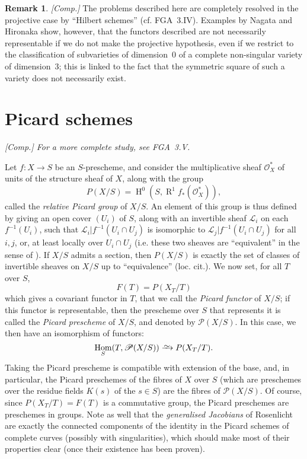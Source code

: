 \documentclass{article}
\theoremstyle{plain}
\theoremstyle{definition}
\newtheorem*{remark*}{Remark}
\newcommand{\sh}[1]{{\mathscr{#1}}}
\newcommand{\simto}{\xrightarrow{\raisebox{-0.7ex}[0ex][0ex]{$\sim$}}}
\DeclareMathOperator{\Hom}{Hom}
\DeclareMathOperator{\HH}{H}
\DeclareMathOperator{\RR}{R}
\newcommand{\oldpage}[1]{\marginpar{\footnotesize$\Big\vert$ \textit{p.~#1}}}
\begin{document}
\begin{remark*}
  \emph{[Comp.]}
  The problems described here are completely resolved in the projective case by ``Hilbert schemes'' (cf. FGA~3.IV).
  Examples by Nagata and Hironaka show, however, that the functors described are not necessarily representable if we do not make the projective hypothesis, even if we restrict to the classification of subvarieties of dimension~$0$ of a complete non-singular variety of dimension~$3$;
  this is linked to the fact that the symmetric square of such a variety does not necessarily exist.
\end{remark*}


\section{Picard schemes}
\label{C.3}

\emph{[Comp.] For a more complete study, see FGA~3.V.}

Let $f\colon X\to S$ be an $S$-prescheme, and consider the multiplicative sheaf $\sh{O}_X^*$ of units of the structure sheaf of $X$, along with the group
\[
  P(X/S) = \HH^0(S,\RR^1f_*(\sh{O}_X^*)),
\]
called the \emph{relative Picard group} of $X/S$.
An element of this group is thus defined by giving an open cover $(U_i)$ of $S$, along with an invertible sheaf $\sh{L}_i$ on each $f^{-1}(U_i)$, such that $\sh{L}_i|f^{-1}(U_i\cap U_j)$ is isomorphic to $\sh{L}_j|f^{-1}(U_i\cap U_j)$ for all $i,j$, or, at least locally over $U_i\cap U_j$ (i.e. these two sheaves are ``equivalent'' in the sense of \cite[B.4]{3}).
If $X/S$ admits a section, then $P(X/S)$ is exactly the set of classes of invertible sheaves on $X/S$ up to ``equivalence'' (loc. cit.).
We now set, for all $T$ over $S$,
\[
  F(T) = P(X_T/T)
\]
which gives a covariant functor in $T$, that we call the \emph{Picard functor} of $X/S$;
if this functor is representable, then the prescheme over $S$ that represents it is called the \emph{Picard prescheme} of $X/S$, and denoted by $\sh{P}(X/S)$.
In this case, we then have an isomorphism of functors:
\[
  \Hom_S(T,\sh{P}(X/S)) \simto P(X_T/T).
\]
Taking the Picard prescheme is compatible with extension of the base, and, in particular, the Picard preschemes of the fibres of $X$ over $S$ (which are preschemes over the residue fields $K(s)$ of the $s\in S$) are the fibres
\oldpage{195-16}
of $\sh{P}(X/S)$.
Of course, since $P(X_T/T)=F(T)$ is a commutative group, the Picard preschemes are preschemes in groups.
Note as well that the \emph{generalised Jacobians} of Rosenlicht are exactly the connected components of the identity in the Picard schemes of complete curves (possibly with singularities), which should make most of their properties clear (once their existence has been proven).
\end{document}
